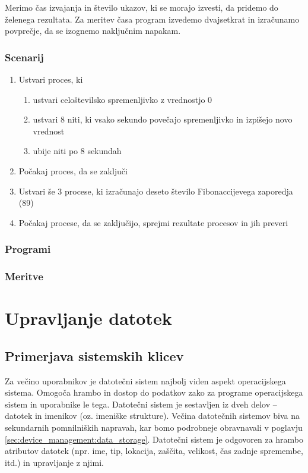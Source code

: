\documentclass[a4paper,12pt,openright]{book}
\begin{document}
Merimo čas izvajanja in število ukazov, ki se morajo izvesti, da pridemo do želenega rezultata.
Za meritev časa program izvedemo dvajsetkrat in izračunamo povprečje, da se izognemo naključnim napakam.

\subsection{Scenarij}

\begin{enumerate}
	\item Ustvari proces, ki
	      \begin{enumerate}
	      	\item ustvari celoštevilsko spremenljivko z vrednostjo 0
	      	\item ustvari 8 niti, ki vsako sekundo povečajo spremenljivko in izpišejo novo vrednost
	      	\item ubije niti po 8 sekundah
	      \end{enumerate}
	\item Počakaj proces, da se zaključi
	\item Ustvari še 3 procese, ki izračunajo deseto število Fibonaccijevega zaporedja (89)
	\item Počakaj procese, da se zaključijo, sprejmi rezultate procesov in jih preveri
\end{enumerate}

\subsection{Programi}

\subsection{Meritve}

\chapter{Upravljanje datotek}

\section{Primerjava sistemskih klicev}

Za večino uporabnikov je datotečni sistem najbolj viden aspekt operacijskega sistema.
Omogoča hrambo in dostop do podatkov zako za programe operacijskega sistem in uporabnike le tega.
Datotečni sistem je sestavljen iz dveh delov -- datotek in imenikov (oz. imeniške strukture).
Večina datotečnih sistemov biva na sekundarnih pomnilniških napravah, kar bomo podrobneje obravnavali v poglavju \ref{sec:device_management:data_storage}.
Datotečni sistem je odgovoren za hrambo atributov datotek (npr. ime, tip, lokacija, zaščita, velikost, čas zadnje spremembe, itd.) in upravljanje z njimi.
\end{document}
